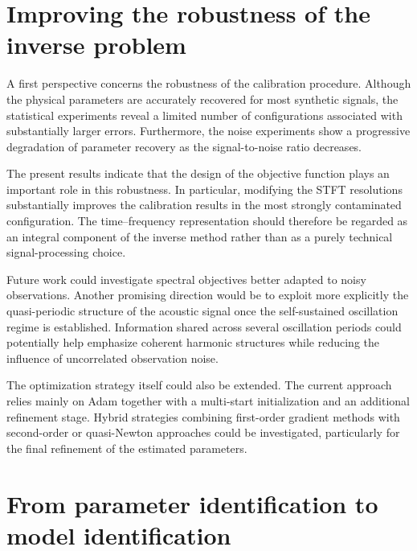 \documentclass[11pt,a4paper]{report}
\theoremstyle{plain}
\theoremstyle{definition}
\begin{document}
\section{Improving the robustness of the inverse problem}

A first perspective concerns the robustness of the calibration procedure.
Although the physical parameters are accurately recovered for most synthetic
signals, the statistical experiments reveal a limited number of configurations
associated with substantially larger errors. Furthermore, the noise experiments
show a progressive degradation of parameter recovery as the signal-to-noise
ratio decreases.

The present results indicate that the design of the objective function plays
an important role in this robustness. In particular, modifying the STFT
resolutions substantially improves the calibration results in the most strongly
contaminated configuration. The time--frequency representation should therefore
be regarded as an integral component of the inverse method rather than as a
purely technical signal-processing choice.

Future work could investigate spectral objectives better adapted to noisy
observations. Another promising direction would be to exploit more explicitly
the quasi-periodic structure of the acoustic signal once the self-sustained
oscillation regime is established. Information shared across several
oscillation periods could potentially help emphasize coherent harmonic
structures while reducing the influence of uncorrelated observation noise.

The optimization strategy itself could also be extended. The current approach
relies mainly on Adam together with a multi-start initialization and an
additional refinement stage. Hybrid strategies combining first-order gradient
methods with second-order or quasi-Newton approaches could be investigated,
particularly for the final refinement of the estimated parameters.

\section{From parameter identification to model identification}
\end{document}
